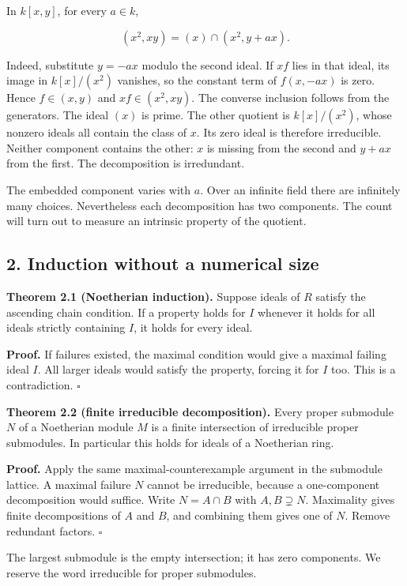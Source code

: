 \documentclass[
]{article}
\begin{document}
In \(k[x,y]\), for every \(a\in k\),

\[
(x^2,xy)=(x)\cap(x^2,y+ax).
\]

Indeed, substitute \(y=-ax\) modulo the second ideal. If \(xf\) lies in
that ideal, its image in \(k[x]/(x^2)\) vanishes, so the constant term
of \(f(x,-ax)\) is zero. Hence \(f\in(x,y)\) and \(xf\in(x^2,xy)\). The
converse inclusion follows from the generators. The ideal \((x)\) is
prime. The other quotient is \(k[x]/(x^2)\), whose nonzero ideals all
contain the class of \(x\). Its zero ideal is therefore irreducible.
Neither component contains the other: \(x\) is missing from the second
and \(y+ax\) from the first. The decomposition is irredundant.

The embedded component varies with \(a\). Over an infinite field there
are infinitely many choices. Nevertheless each decomposition has two
components. The count will turn out to measure an intrinsic property of
the quotient.

\subsection{2. Induction without a numerical
size}\label{induction-without-a-numerical-size}

\textbf{Theorem 2.1 (Noetherian induction).} Suppose ideals of \(R\)
satisfy the ascending chain condition. If a property holds for \(I\)
whenever it holds for all ideals strictly containing \(I\), it holds for
every ideal.

\textbf{Proof.} If failures existed, the maximal condition would give a
maximal failing ideal \(I\). All larger ideals would satisfy the
property, forcing it for \(I\) too. This is a contradiction. \(\square\)

\textbf{Theorem 2.2 (finite irreducible decomposition).} Every proper
submodule \(N\) of a Noetherian module \(M\) is a finite intersection of
irreducible proper submodules. In particular this holds for ideals of a
Noetherian ring.

\textbf{Proof.} Apply the same maximal-counterexample argument in the
submodule lattice. A maximal failure \(N\) cannot be irreducible,
because a one-component decomposition would suffice. Write \(N=A\cap B\)
with \(A,B\supsetneq N\). Maximality gives finite decompositions of
\(A\) and \(B\), and combining them gives one of \(N\). Remove redundant
factors. \(\square\)

The largest submodule is the empty intersection; it has zero components.
We reserve the word irreducible for proper submodules.
\end{document}
